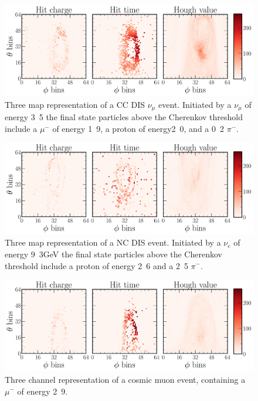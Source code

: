 \begin{figure} %
    \includegraphics[width=\textwidth]{diagrams/6-cvn/chipsnet/explore_numu_ccdis_event.pdf}
    \caption[Example of a CC DIS $\nu_{\mu}$ event.]
    {Three map representation of a CC DIS $\nu_{\mu}$ event. Initiated by a $\nu_{\mu}$ of
        energy \unit{3.5}{\GeV} the final state particles above the Cherenkov threshold include a
        $\mu^{-}$ of energy \unit{1.9}{\GeV}, a proton of energy\unit{2.0}{\GeV}, and a
        \unit{0.2}{\GeV} $\pi^{-}$.}
    \label{fig:explore_numu_ccdis_event}
\end{figure}

\begin{figure} %
    \includegraphics[width=\textwidth]{diagrams/6-cvn/chipsnet/explore_nuel_ncdis_event.pdf}
    \caption[Example of a NC DIS event.]
    {Three map representation of a NC DIS event. Initiated by a $\nu_{e}$ of energy
        \unit{9.3}{GeV} the final state particles above the Cherenkov threshold include a proton
        of energy \unit{2.6}{\GeV} and a \unit{2.5}{\GeV} $\pi^{-}$.}
    \label{fig:explore_nuel_ncdis_event}
\end{figure}

\begin{figure} %
    \includegraphics[width=\textwidth]{diagrams/6-cvn/chipsnet/explore_cosmic_event.pdf}
    \caption[Example of a cosmic muon event.]
    {Three channel representation of a cosmic muon event, containing a $\mu^{-}$ of energy
        \unit{2.9}{\GeV}.}
    \label{fig:explore_cosmic_event}
\end{figure}

